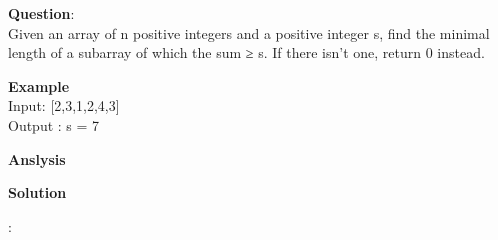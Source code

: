     
\begin{description}
    \item{\textbf{Question}}:\\%
		Given an array of n positive integers and a positive integer s, find the minimal length of a subarray of which the sum ≥ s. If there isn't one, return 0 instead.\\

    \item{\textbf{Example}}\\
		Input: [2,3,1,2,4,3]\\
		Output : s = 7\\

    \item{\textbf{Anslysis}}\\

    \item{\textbf{Solution}}\\
	\item{} : \\
		\begin{lstlisting}
		\end{lstlisting}

\end{description}

